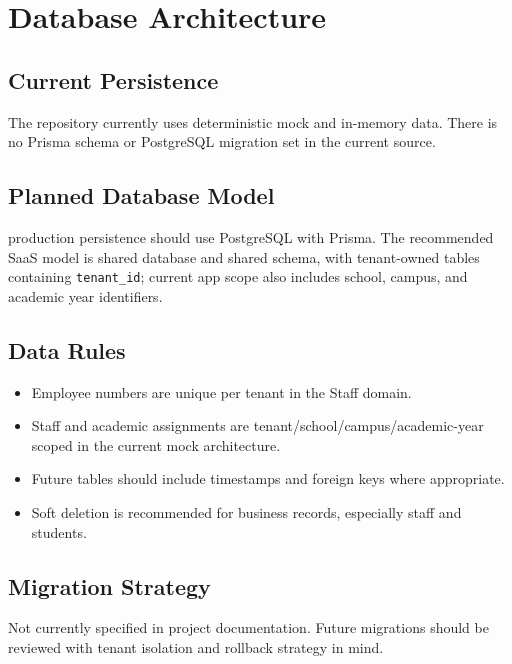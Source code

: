 \chapter{Database Architecture}
\section{Current Persistence}
The repository currently uses deterministic mock and in-memory data. There is no Prisma schema or PostgreSQL migration set in the current source.

\section{Planned Database Model}
\statusplanned{} production persistence should use PostgreSQL with Prisma. The recommended SaaS model is shared database and shared schema, with tenant-owned tables containing \texttt{tenant\_id}; current app scope also includes school, campus, and academic year identifiers.

\section{Data Rules}
\begin{itemize}
\item Employee numbers are unique per tenant in the Staff domain.
\item Staff and academic assignments are tenant/school/campus/academic-year scoped in the current mock architecture.
\item Future tables should include timestamps and foreign keys where appropriate.
\item Soft deletion is recommended for business records, especially staff and students.
\end{itemize}

\section{Migration Strategy}
Not currently specified in project documentation. Future migrations should be reviewed with tenant isolation and rollback strategy in mind.
